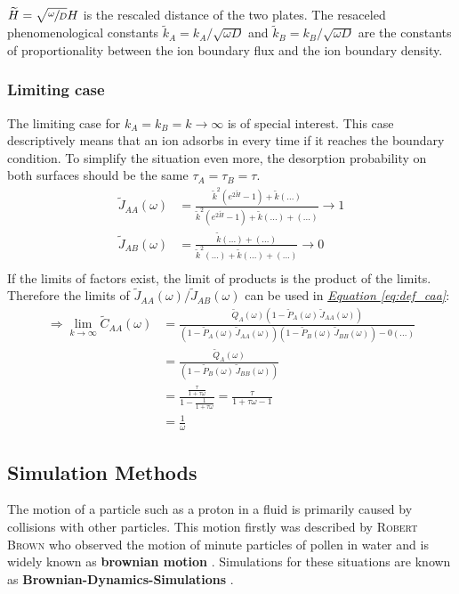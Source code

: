 \documentclass[a4paper, parskip=half]{scrartcl}
\newcommand{\person}[1]{%
	\textsc{#1}%
}
\newcommand{\effect}[1]{%
	\textbf{#1}%
}
\newcommand{\myEqRef}[1]{\textit{\hyperref[eq:#1]{Equation \ref*{eq:#1}}}}
\newcommand{\myEqLabel}[1]{\label{eq:#1}}
\begin{document}
$\widetilde{H} = \sqrt{\sfrac{\omega}{D}} H$ is the rescaled distance of the two plates. The resaceled phenomenological constants $\widetilde{k}_A = k_A / \sqrt{\omega D}$ and $\widetilde{k}_B = k_B / \sqrt{\omega D}$ are the constants of proportionality between the ion boundary flux and the ion boundary density.
\subsubsection{Limiting case}
The limiting case for $k_A = k_B = k \rightarrow \infty$ is of special interest. This case descriptively means that an ion adsorbs in every time if it reaches the boundary condition. To simplify the situation even more, the desorption probability on both surfaces should be the same $\tau_A = \tau_B = \tau$.
\begin{align}
\widetilde{J}_{AA}(\omega) &= \frac{\widetilde{k}^2 \left(e^{2\widetilde{H}} - 1\right) + \widetilde{k}(...)}{\widetilde{k}^2 \left(e^{2\widetilde{H}} - 1\right) + \widetilde{k}(...) + (...)} \rightarrow 1\\
\widetilde{J}_{AB}(\omega) &= \frac{\widetilde{k}(...) + (...)}{\widetilde{k}^2(...) + \widetilde{k}(...) + (...)} \rightarrow 0\\
\end{align}
If the limits of factors exist, the limit of products is the product of the limits. Therefore the limits of $\widetilde{J}_{AA}(\omega)/\widetilde{J}_{AB}(\omega)$ can be used in \myEqRef{def_caa}:
\begin{align}
\Rightarrow \lim_{k\rightarrow\infty} \widetilde{C}_{AA}(\omega) &= \frac{\widetilde{Q}_A(\omega)\left(1 - \widetilde{P}_A(\omega)\, \widetilde{J}_{AA}(\omega) \right)}{\left(1 - \widetilde{P}_A(\omega)\, \widetilde{J}_{AA}(\omega) \right)\left(1 - \widetilde{P}_B(\omega)\, \widetilde{J}_{BB}(\omega) \right) - 0(...)}\\
&= \frac{\widetilde{Q}_A(\omega)}{\left(1 - \widetilde{P}_B(\omega)\, \widetilde{J}_{BB}(\omega) \right)}\\
&= \frac{\frac{\tau}{1+\tau\omega}}{1-\frac{1}{1+\tau\omega}} = \frac{\tau}{1+\tau\omega - 1}\\
&= \frac{1}{\omega} \myEqLabel{analytic_caa}
\end{align}
\newpage
\subsection{Simulation Methods}
The motion of a particle such as a proton in a fluid is primarily  caused by collisions with other particles. This motion firstly was described by \person{Robert Brown} who observed the motion of minute particles of pollen in water and is widely known as \effect{brownian motion}. Simulations for these situations are known as \effect{Brownian-Dynamics-Simulations}.
\end{document}
